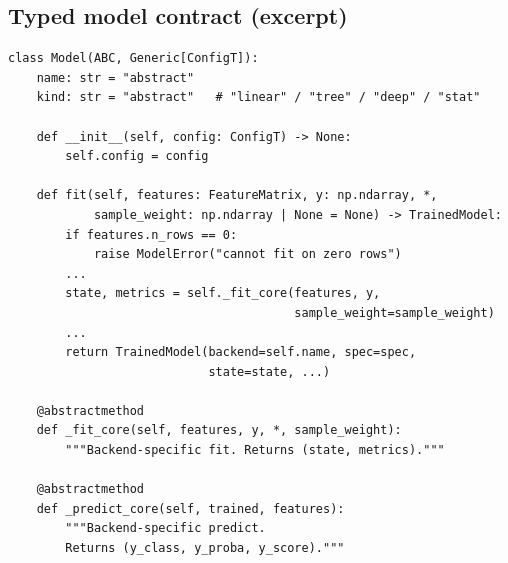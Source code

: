 \documentclass[11pt,a4paper]{article}
\begin{document}
\subsection{Typed model contract (excerpt)}
\begin{lstlisting}[caption={Excerpt of \texttt{kairon/models/base.py}: the abstract \texttt{Model} class. The
contract is generic in the configuration type, and the public
\texttt{fit} and \texttt{predict} methods add input
validation, target-kind inference, and a uniform
\texttt{TrainedModel} / \texttt{Prediction} return type.},label={lst:model}]
class Model(ABC, Generic[ConfigT]):
    name: str = "abstract"
    kind: str = "abstract"   # "linear" / "tree" / "deep" / "stat"

    def __init__(self, config: ConfigT) -> None:
        self.config = config

    def fit(self, features: FeatureMatrix, y: np.ndarray, *,
            sample_weight: np.ndarray | None = None) -> TrainedModel:
        if features.n_rows == 0:
            raise ModelError("cannot fit on zero rows")
        ...
        state, metrics = self._fit_core(features, y,
                                        sample_weight=sample_weight)
        ...
        return TrainedModel(backend=self.name, spec=spec,
                            state=state, ...)

    @abstractmethod
    def _fit_core(self, features, y, *, sample_weight):
        """Backend-specific fit. Returns (state, metrics)."""

    @abstractmethod
    def _predict_core(self, trained, features):
        """Backend-specific predict.
        Returns (y_class, y_proba, y_score)."""
\end{lstlisting}
\end{document}
